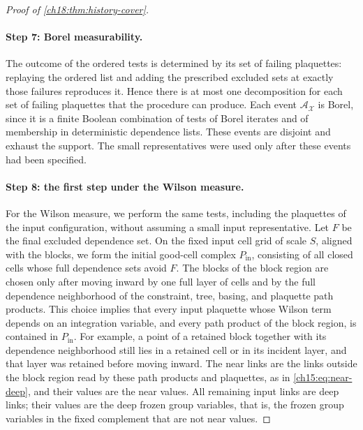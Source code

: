 \begin{proof}[Proof of \cref{ch18:thm:history-cover}]
\paragraph{Step 7: Borel measurability.}
The outcome of the ordered tests is determined by its set of failing plaquettes: replaying the ordered list and adding the prescribed excluded sets at exactly those failures reproduces it. Hence there is at most one decomposition for each set of failing plaquettes that the procedure can produce. Each event $\mathcal A_{\mathcal X}$ is Borel, since it is a finite Boolean combination of tests of Borel iterates and of membership in deterministic dependence lists. These events are disjoint and exhaust the support. The small representatives were used only after these events had been specified.

\paragraph{Step 8: the first step under the Wilson measure.}
For the Wilson measure, we perform the same tests, including the plaquettes of the input configuration, without assuming a small input representative. Let $F$ be the final excluded dependence set. On the fixed input cell grid of scale $S$, aligned with the blocks, we form the initial good-cell complex $P_{\mathrm{in}}$, consisting of all closed cells whose full dependence sets avoid $F$. The blocks of the block region are chosen only after moving inward by one full layer of cells and by the full dependence neighborhood of the constraint, tree, basing, and plaquette path products. This choice implies that every input plaquette whose Wilson term depends on an integration variable, and every path product of the block region, is contained in $P_{\mathrm{in}}$. For example, a point of a retained block together with its dependence neighborhood still lies in a retained cell or in its incident layer, and that layer was retained before moving inward. The near links are the links outside the block region read by these path products and plaquettes, as in \eqref{ch15:eq:near-deep}, and their values are the near values. All remaining input links are deep links; their values are the deep frozen group variables, that is, the frozen group variables in the fixed complement that are not near values.


\end{proof}
